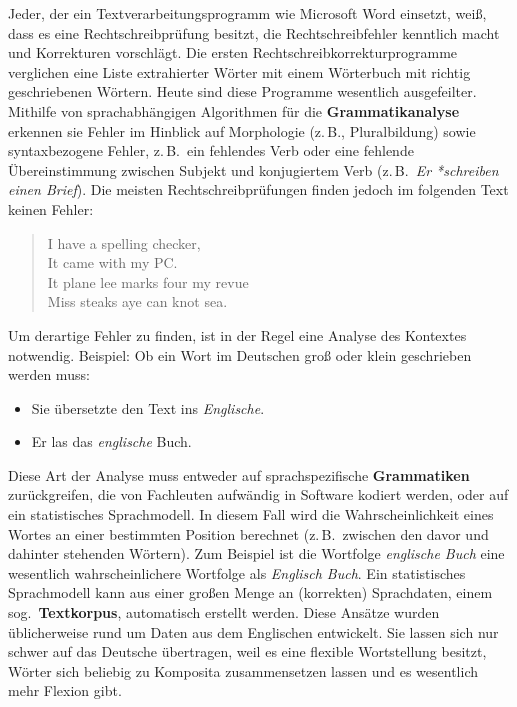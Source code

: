 \documentclass[]{../../metanetpaper}
\begin{document}
\begin{multicols}{2}
Jeder, der ein Textverarbeitungsprogramm wie Microsoft Word einsetzt, weiß, dass es eine Rechtschreibprüfung besitzt, die Rechtschreibfehler kenntlich macht und Korrekturen vorschlägt. Die ersten Rechtschreibkorrekturprogramme verglichen eine Liste extrahierter Wörter mit einem Wörterbuch mit richtig geschriebenen Wörtern. Heute sind diese Programme wesentlich ausgefeilter. Mithilfe von sprachabhängigen Algorithmen für die \textbf{Grammatikanalyse} erkennen sie Fehler im Hinblick auf Morphologie (z.\,B., Pluralbildung) sowie syntaxbezogene Fehler, z.\,B.~ein fehlendes Verb oder eine fehlende Übereinstimmung zwischen Subjekt und konjugiertem Verb (z.\,B.~\textit{Er *schreiben einen Brief}). Die meisten Rechtschreibprüfungen finden jedoch im folgenden Text \cite{zar1} keinen Fehler:

\begin{quote}
  I have a spelling checker,\\
  It came with my PC.\\
  It plane lee marks four my revue\\
  Miss steaks aye can knot sea.
\end{quote}

Um derartige Fehler zu finden, ist in der Regel eine Analyse des Kontextes notwendig. Beispiel: Ob ein Wort im Deutschen groß oder klein geschrieben werden muss:

\begin{itemize}
\item Sie übersetzte den Text ins \textit{Englische}.
\item Er las das \textit{englische} Buch.
\end{itemize}

Diese Art der Analyse muss entweder auf sprachspezifische \textbf{Grammatiken} zurückgreifen, die von Fachleuten aufwändig in Software kodiert werden, oder auf ein statistisches Sprachmodell. In diesem Fall wird die Wahrscheinlichkeit eines Wortes an einer bestimmten Position berechnet (z.\,B.~zwischen den davor und dahinter stehenden Wörtern). Zum Beispiel ist die Wortfolge \textit{englische Buch} eine wesentlich wahrscheinlichere Wortfolge als \textit{Englisch Buch}. Ein statistisches Sprachmodell kann aus einer großen Menge an (korrekten) Sprachdaten, einem sog.~\textbf{Textkorpus}, automatisch erstellt werden. Diese Ansätze wurden üblicherweise rund um Daten aus dem Englischen entwickelt. Sie lassen sich nur schwer auf das Deutsche übertragen, weil es eine flexible Wortstellung besitzt, Wörter sich beliebig zu Komposita zusammensetzen lassen und es wesentlich mehr Flexion gibt.


\end{multicols}
\end{document}
